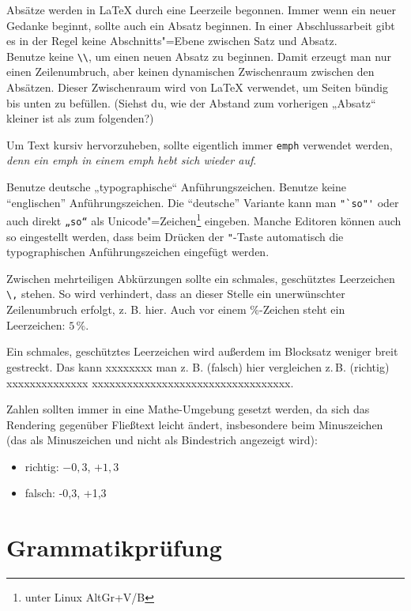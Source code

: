 Absätze werden in \LaTeX{} durch eine Leerzeile begonnen.
Immer wenn ein neuer Gedanke beginnt, sollte auch ein Absatz beginnen.
In einer Abschlussarbeit gibt es in der Regel keine Abschnitts"=Ebene zwischen Satz und Absatz.\\
Benutze keine \verb|\\|, um einen neuen Absatz zu beginnen.
Damit erzeugt man nur einen Zeilenumbruch, aber keinen dynamischen Zwischenraum zwischen den Absätzen.
Dieser Zwischenraum wird von \LaTeX{} verwendet, um Seiten bündig bis unten zu befüllen.
(Siehst du, wie der Abstand zum vorherigen „Absatz“ kleiner ist als zum folgenden?)

Um Text kursiv hervorzuheben, sollte eigentlich immer \verb|emph| verwendet werden, \emph{denn ein emph \emph{in einem emph} hebt sich wieder auf}.

Benutze deutsche „typographische“ Anführungszeichen.
Benutze keine ``englischen'' Anführungszeichen.
Die "`deutsche"' Variante kann man \verb|"`so"'| oder auch direkt \verb|„so“| als Unicode"=Zeichen\footnote{unter Linux AltGr+V/B} eingeben.
Manche Editoren können auch so eingestellt werden, dass beim Drücken der \verb|"|-Taste automatisch die typographischen Anführungszeichen eingefügt werden.

Zwischen mehrteiligen Abkürzungen sollte ein schmales, geschütztes Leerzeichen \verb|\,| stehen. So wird verhindert, dass an dieser Stelle ein unerwünschter Zeilenumbruch erfolgt, z. B. hier.
Auch vor einem \%-Zeichen steht ein Leerzeichen: $5\,\%$.

Ein schmales, geschütztes Leerzeichen wird außerdem im Blocksatz weniger breit gestreckt. Das kann xxxxxxxx man z. B. (falsch) hier vergleichen z.\,B. (richtig) xxxxxxxxxxxxxx xxxxxxxxxxxxxxxxxxxxxxxxxxxxxxxxxx.

Zahlen sollten immer in eine Mathe-Umgebung gesetzt werden, da sich das Rendering gegenüber Fließtext leicht ändert, insbesondere beim Minuszeichen (das als Minuszeichen und nicht als Bindestrich angezeigt wird):

\begin{itemize}
    \item richtig: $-0,3$, $+1,3$
    \item falsch: -0,3, +1,3
\end{itemize}


\section{Grammatikprüfung}

